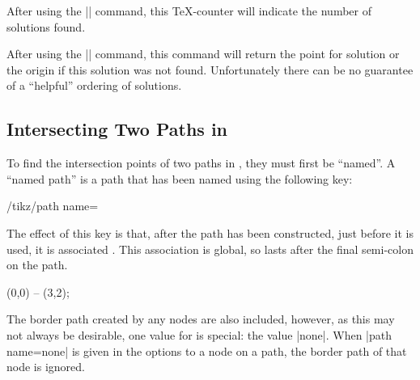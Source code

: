 \begin{command}{\pgfintersectionsolutions}
  After using the |\pgfintersectionofpaths| command, this \TeX-counter
  will indicate the number of solutions found.
\end{command}

\begin{command}{\pgfpointintersectionsolution{}}
  After using the |\pgfintersectionofpaths| command, this command
  will return the point for solution  or the origin
  if this solution was not found. Unfortunately
  there can be no guarantee of a ``helpful'' ordering of solutions.
\end{command}

\subsection{Intersecting Two Paths in \tikzname}

  To find the intersection points of two paths in \tikzname, they must 
  first be ``named''. A ``named path'' is a path that has been named 
  using the following key:
  
\begin{key}{/tikz/path name=}

	The effect of this key is that, after the path has been constructed,
  just before it is used, it is associated . This 
  association is global, so lasts after the final semi-colon on the
  path.
  
\begin{codeexample}
\draw [path name=straight line] (0,0) -- (3,2);
\end{codeexample}

  The border path created by any nodes are also included, however,
  as this may not always be desirable, one value for  
  is special: the value |none|. When |path name=none| is given 
  in the options to a node on a path, the border path of that node 
  is ignored. 

\begin{codeexample}[]
\end{codeexample}
\end{key}


